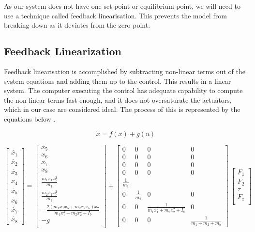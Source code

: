 \documentclass{UoNMCHA}
\numberwithin{equation}{section}
\begin{document}
	As our system does not have one set point or equilibrium point, we will need to use a technique called
	feedback linearisation. This prevents the model from breaking down as it deviates from the zero point.
	
	\newpage
	\subsection{Feedback Linearization}
	
Feedback linearisation is accomplished by subtracting non-linear terms out of the system equations and adding them up to the control. This results in a linear system. The computer executing the control has adequate capability to compute the non-linear terms fast enough, and it does not oversaturate the actuators, which in our case are considered ideal. The process of this is represented by the equations below \cite{franklin_2015_feedback}.

	\begin{equation}
		\dot{x}=f(x)+g(u)
	\end{equation}
	
	\begin{equation} \label{eq/fxgu}
	\begin{bmatrix}
	\dot{x_{1}} \\
	\dot{x_{2}} \\
	\dot{x_{3}} \\
	\dot{x_{4}} \\
	\dot{x_{5}} \\
	\dot{x_{6}} \\
	\dot{x_{7}} \\
	\dot{x_{8}}
	\end{bmatrix} = 
	\begin{bmatrix}
	x_{5} \\
	x_{6} \\
	x_{7} \\
	x_{8} \\
	\frac{m_1 x_1 x_7^2}{m_1} \\
	\frac{m_2 x_2 x_7^2}{m_2} \\
	-\frac{2(m_1 x_1 x_5 + m_2 x_2 x_6)x_7}{m_1 x_1^2 + m_2x_2^2 + I_b} \\
	-g \\
	\end{bmatrix} +
	\begin{bmatrix}
	0 & 0 & 0 & 0 \\
	0 & 0 & 0 & 0 \\
	0 & 0 & 0 & 0 \\
	0 & 0 & 0 & 0 \\
	\frac{1}{m_{1}} & & & \\
	0 & \frac{1}{m_{2}} & 0 & 0 \\
	0 & 0 & \frac{1}{m_1 x_1^2 + m_2 x_2^2 + I_b} & 0 \\
	0 & 0 & 0 & \frac{1}{m_1  + m_2  + m_b}
	\end{bmatrix}\ 
	\begin{bmatrix}
	F_1 \\
	F_2 \\
	\tau \\
	F_z \\
	\end{bmatrix}
	\end{equation}
	
\end{document}
